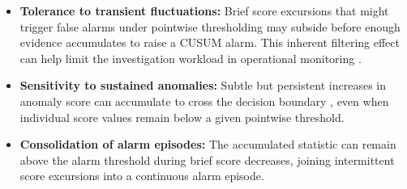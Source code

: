 \begin{itemize}
    \item \textbf{Tolerance to transient fluctuations:} Brief score excursions that might trigger false alarms under pointwise thresholding may subside before enough evidence accumulates to raise a CUSUM alarm. This inherent filtering effect can help limit the investigation workload in operational monitoring \cite{msl_smap_data}.

    \item \textbf{Sensitivity to sustained anomalies:} Subtle but persistent increases in anomaly score can accumulate to cross the decision boundary \cite{cusumseminal}, even when individual score values remain below a given pointwise threshold.

    \item \textbf{Consolidation of alarm episodes:} The accumulated statistic can remain above the alarm threshold during brief score decreases, joining intermittent score excursions into a continuous alarm episode.
\end{itemize}

